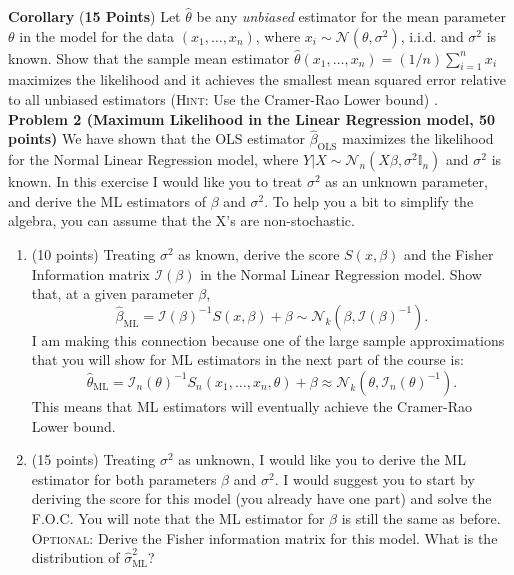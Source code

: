 \documentclass[11pt]{article} %
\begin{document}
\noindent \textbf{Corollary} (\textbf{15 Points}) Let $\widehat{\theta}$ be any \emph{unbiased} estimator for the mean parameter $\theta$ in the model for the data $(x_1,\ldots, x_n)$, where $x_i \sim \mathcal{N}(\theta, \sigma^2)$, i.i.d. and $\sigma^2$ is known. Show that the sample mean estimator
$\widehat{\theta}(x_1, \ldots, x_n) = (1/n) \sum_{i=1}^{n} x_i$
\noindent maximizes the likelihood and it achieves the smallest mean squared error relative to all unbiased estimators ({\scshape Hint:} Use the Cramer-Rao Lower bound) . \\

\noindent \textbf{Problem 2 (Maximum Likelihood in the Linear Regression model, 50 points)} We have shown that the OLS estimator $\widehat{\beta}_{\textrm{OLS}}$ maximizes the likelihood for the Normal Linear Regression model, where $Y|X \sim \mathcal{N}_{n} (X\beta, \sigma^2 \mathbb{I}_n)$ and $\sigma^2$ is known. In this exercise I would like you to treat $\sigma^2$ as an unknown parameter, and derive the ML estimators of $\beta$ and $\sigma^2$. To help you a bit to simplify the algebra, you can assume that the X's are non-stochastic. 
\begin{enumerate}
\item  (10 points) Treating $\sigma^2$ as known, derive the score $S(x,\beta)$ and the Fisher Information matrix $\mathcal{I}(\beta)$  in the Normal Linear Regression model. Show that, at a given parameter $\beta$, 
	\[ \widehat{\beta}_{\textrm{ML}} =  \mathcal{I}(\beta)^{-1} S(x,\beta)  + \beta   \sim \mathcal{N}_k ( \beta, \mathcal{I}(\beta)^{-1} ). \]
	I am making this connection because one of the large sample approximations that you will show for ML estimators in the next part of the course is:
	\[ \widehat{\theta}_{\textrm{ML}} =  \mathcal{I}_n(\theta)^{-1} S_n(x_1, \ldots, x_n,\theta)  + \beta   \approx \mathcal{N}_k ( \theta, \mathcal{I}_n(\theta)^{-1} ). \]
This means that ML estimators will eventually achieve the Cramer-Rao Lower bound.  \\

\item (15 points) Treating $\sigma^2$ as unknown, I would like you to derive the ML estimator for both parameters $\beta$ and $\sigma^2$. I would suggest you to start by deriving the score for this model (you already have one part) and solve the F.O.C. You will note that the ML estimator for $\beta$ is still the same as before. {\scshape Optional:} Derive the Fisher information matrix for this model. What is the distribution of $\widehat{\sigma}^2_{\textrm{ML}}$? 

\end{enumerate}
\end{document}

